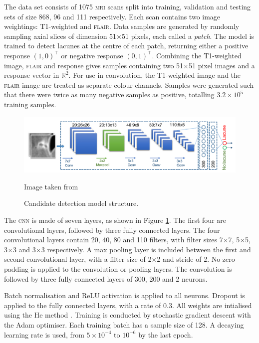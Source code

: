 The data set consists of 1075 \textsc{mri} scans split into training, validation and testing sets of size 868, 96 and 111 respectively. Each scan contains two image weightings: T1-weighted and \textsc{flair}. Data samples are generated by randomly sampling axial slices of dimension 51$\times$51 pixels, each called a \textit{patch}. The model is trained to detect lacunes at the centre of each patch, returning either a positive response $(1, 0)^\intercal$ or negative response $(0, 1)^\intercal$. Combining the T1-weighted image, \textsc{flair} and response gives samples containing two 51$\times$51 pixel images and a response vector in $\mathbb{R}^2$. For use in convolution, the T1-weighted image and the \textsc{flair} image are treated as separate colour channels. Samples were generated such that there were twice as many negative samples as positive, totalling $3.2\times10^5$ training samples.

\begin{figure}[ht]
	\centering
	\includegraphics[width=\textwidth]{Images/5_ghafoorian_model1.png}
	\caption{Candidate detection model structure.}
	\small Image taken from \citep{GhafoorianM.2017Dml3}
	\label{litrev-ghafoorian_model1fig}
\end{figure}

The \textsc{cnn} is made of seven layers, as shown in Figure \ref{litrev-ghafoorian_model1fig}. The first four are convolutional layers, followed by three fully connected layers. The four convolutional layers contain 20, 40, 80 and 110 filters, with filter sizes 7$\times$7, 5$\times$5, 3$\times$3 and 3$\times$3 respectively. A max pooling layer is included between the first and second convolutional layer, with a filter size of 2$\times$2 and stride of 2. No zero padding is applied to the convolution or pooling layers. The convolution is followed by three fully connected layers of 300, 200 and 2 neurons.

Batch normalisation and ReLU activation is applied to all neurons. Dropout is applied to the fully connected layers, with a rate of 0.3. All weights are intialised using the He method \citep{HeKaiming2015DDiR}. Training is conducted by stochastic gradient descent with the Adam optimiser. Each training batch has a sample size of 128. A decaying learning rate is used, from $5\times10^{-4}$ to $10^{-6}$ by the last epoch.

